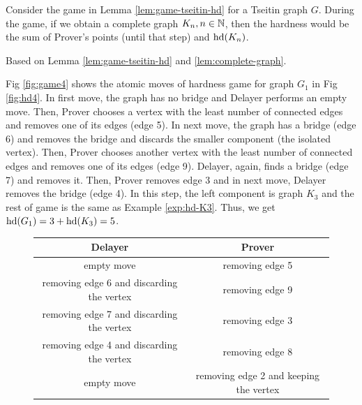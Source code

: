 \documentclass{report}
\begin{document}
\begin{lem}\label{lem:graphwithcomplt}
Consider the game in Lemma \ref{lem:game-tseitin-hd} for a Tseitin graph $G$. During the game, if we obtain a complete graph $K_n, n \in \mathbb{N}$, then the hardness would be the sum of Prover's points (until that step) and $\operatorname{hd}(K_n)$.
\end{lem}	
\begin{prf}
Based on Lemma \ref{lem:game-tseitin-hd} and \ref{lem:complete-graph}.
\end{prf}
  
\begin{examp}\label{exp:graph-notK}
Fig \ref{fig:game4} shows the atomic moves of hardness game for graph $G_1$ in Fig \ref{fig:hd4}. In first move, the graph has no bridge and Delayer performs an empty move. Then, Prover chooses a vertex with the least number of connected edges and removes one of its edges (edge 5). In next move, the graph has a bridge (edge 6) and removes the bridge and discards the smaller component (the isolated vertex). Then, Prover chooses another vertex with the least number of connected edges and removes one of its edges (edge 9). Delayer, again, finds a bridge (edge 7) and removes it. Then, Prover removes edge 3 and in next move, Delayer removes the bridge (edge 4). In this step, the left component is graph $K_3$ and the rest of game is the same as Example \ref{exp:hd-K3}. Thus, we get $\operatorname{hd}(G_1)=3+\operatorname{hd}(K_3)=5$.
  \begin{figure}[h]
  \centering
  \begin{tabular}{|c|c|} 
  \hline
                  Delayer & Prover \\ \hline
                  empty move & removing edge 5  \\ \hline
		  removing edge 6 and discarding the vertex & removing edge 9  \\ \hline
		  removing edge 7 and discarding the vertex & removing edge 3  \\ \hline
		  removing edge 4 and discarding the vertex & removing edge 8  \\ \hline
		  empty move & removing edge 2  and keeping the vertex\\ \hline


\end{tabular}
\end{figure}
\end{examp}
\end{document}
